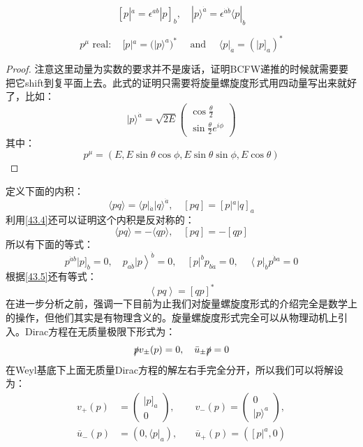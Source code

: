 \begin{equation}\label{43.4}
\boxed{
	[p|^a=\epsilon^{ab}|p]_b,\quad|p\rangle^{\dot{a}}=\epsilon^{\dot{a}\dot{b}}\langle p|_{\dot{b}}
}
\end{equation}
\begin{theorem}
	\begin{equation}\label{43.5}
		p^\mu\text{ real}:\quad[p|^a=(|p\rangle^a)^*\quad\text{ and }\quad\langle p|_{\dot{a}}=(|p]_a)^*
	\end{equation}
\end{theorem}
\begin{proof}
	注意这里动量为实数的要求并不是废话，证明BCFW递推的时候就需要要把它shift到复平面上去。此式的证明只需要将旋量螺旋度形式用四动量写出来就好了，比如：
	\[|p\rangle^{\dot{a}}=\sqrt{2E}\begin{pmatrix}\cos\frac\theta2\\\sin\frac\theta2e^{i\phi}\end{pmatrix}\]
	其中：
	\[p^\mu=(E,E\sin\theta\cos\phi,E\sin\theta\sin\phi,E\cos\theta)\]
\end{proof}
定义下面的内积：
\begin{equation}
	\langle pq\rangle=\langle p|_{\dot{a}}|q\rangle^{\dot{a}},\quad[pq]=[p|^{a}|q]_{a}
\end{equation}
利用\ref{43.4}还可以证明这个内积是反对称的：
\begin{equation}
	\langle pq\rangle=-\langle qp\rangle,\quad[pq]=-[qp]
\end{equation}
所以有下面的等式：
\begin{equation}\label{43.9}
	p^{\dot{a}b}|p]_b=0,\quad\left.p_{a\dot{b}}|p\right>^{\dot{b}}=0,\quad\left[p\right|^bp_{b\dot{a}}=0,\quad\left<p\right|_{\dot{b}}p^{\dot{b}a}=0
\end{equation}
根据\ref{43.5}还有等式：
\begin{equation}\label{43.10}
	\left\langle pq\right\rangle =[qp]^*
\end{equation}
在进一步分析之前，强调一下目前为止我们对旋量螺旋度形式的介绍完全是数学上的操作，但他们其实是有物理含义的。旋量螺旋度形式完全可以从物理动机上引入。Dirac方程在无质量极限下形式为：
\begin{equation}
	\slashed{p}v_{\pm}(p)=0,\quad\bar u_{\pm}\slashed{p}=0
\end{equation}
在Weyl基底下上面无质量Dirac方程的解左右手完全分开，所以我们可以将解设为：
\begin{equation}\label{43.12}
	\begin{aligned}v_+(p)&=\begin{pmatrix}|p]_a\\0\end{pmatrix},\quad&v_-(p)=\begin{pmatrix}0\\|p\rangle^a\end{pmatrix},\\\overline{u}_-(p)&=\left(0,\langle p|_a\right),\quad&\overline{u}_+(p)=\left(\left[p\right|^a,0\right)\end{aligned}
\end{equation}

